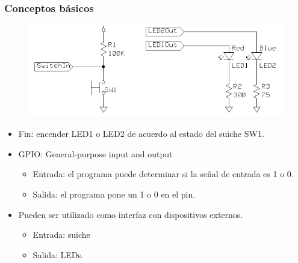 \documentclass[10.5pt,scale=1.0,t,aspectratio=169,hyperref={pdfpagelabels=false}]{beamer}
\begin{document}
\begin{frame}
	\frametitle{Conceptos básicos}
	\begin{figure}
		\centering
		\includegraphics[scale=0.4]{01_BasicConcept}
	\end{figure}
	\begin{itemize}
		\item Fin: encender LED1 o LED2 de acuerdo al estado del suiche SW1.
		\item GPIO: General-purpose input and output
		\begin{itemize}
			\item Entrada: el programa puede determinar si la señal de entrada es 1 o 0.
			\item Salida: el programa pone un 1 o 0 en el pin. 
		\end{itemize}
		\item Pueden ser utilizado como interfaz con dispositivos externos.
		\begin{itemize}
			\item Entrada: suiche
			\item Salida: LEDs.
		\end{itemize}
	\end{itemize}
\end{frame}
\end{document}
